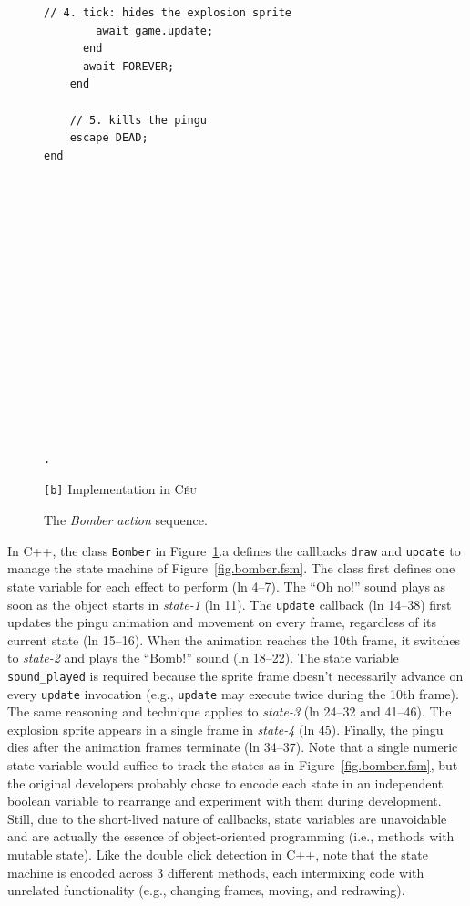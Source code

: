 \documentclass[10pt, conference, compsocconf]{IEEEtran}
\newcommand{\CEU}{\textsc{C\'{e}u}\xspace}
\newcommand{\code}[1] {{\small{\texttt{#1}}}}
\newcommand{\bx}{\code{[b]}\xspace}
\begin{document}
\begin{figure}
\begin{minipage}[t]{0.50\linewidth}
\begin{lstlisting}[xleftmargin=2em]
        // 4. tick: hides the explosion sprite
        await game.update;
      end
      await FOREVER;
    end

    // 5. kills the pingu
    escape DEAD;
end
















.
\end{lstlisting}
\centering\small{\bx Implementation in \CEU}
\end{minipage}
\caption{ The \emph{Bomber action} sequence.
\label{lst.bomber}
}
\end{figure}

In C++, the class \code{Bomber} in Figure~\ref{lst.bomber}.a defines the
callbacks \code{draw} and \code{update} to manage the state machine of
Figure~\ref{fig.bomber.fsm}.
%
The class first defines one state variable for each effect to perform
(ln 4--7).
The ``Oh no!'' sound plays as soon as the object starts in \emph{state-1} 
(ln 11).
The \code{update} callback (ln 14--38) first updates the pingu animation and
movement on every frame, regardless of its current state (ln 15--16).
When the animation reaches the 10th frame, it switches to \emph{state-2} and
plays the ``Bomb!'' sound (ln 18--22).
The state variable \code{sound\_played} is required because the sprite frame
doesn't necessarily advance on every \code{update} invocation (e.g.,
\code{update} may execute twice during the 10th frame).
The same reasoning and technique applies to \emph{state-3} (ln 24--32 and
41--46).
The explosion sprite appears in a single frame in \emph{state-4} (ln 45).
Finally, the pingu dies after the animation frames terminate (ln 34--37).
%
Note that a single numeric state variable would suffice to track the states as
in Figure~\ref{fig.bomber.fsm}, but the original developers probably chose to
encode each state in an independent boolean 
variable to rearrange and experiment with them during development.
Still, due to the short-lived nature of callbacks, state variables are 
unavoidable and are actually the essence of object-oriented programming
(i.e., methods with mutable state).
%
Like the double click detection in C++, note that the state machine is encoded
across 3 different methods, each intermixing code with unrelated functionality
(e.g., changing frames, moving, and redrawing).
\end{document}
